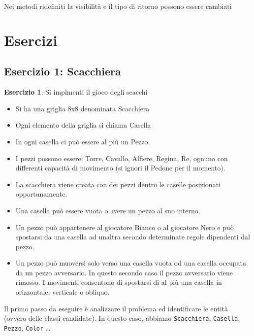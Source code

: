 \documentclass{article}
\begin{document}
Nei metodi ridefiniti la visibilità e il tipo di ritorno possono essere cambiati







\section{Esercizi}

\subsection{Esercizio 1: Scacchiera}
\begin{framed}
\textbf{Esercizio 1}: Si implmenti il gioco degli scacchi
\begin{itemize}
\item Si ha una griglia 8x8 denominata Scacchiera
\item Ogni elemento della griglia si chiama Casella
\item  In ogni casella ci pu\`o essere al pi\`u un Pezzo
\item  I pezzi possono essere: Torre, Cavallo, Alfiere, Regina, Re, ognuno con differenti capacit\`a di movimento (si ignori il Pedone per il momento).
\item La scacchiera viene creata con dei pezzi dentro le caselle posizionati opportunamente.
\item  Una casella pu\`o essere vuota o avere un pezzo al suo interno.
\item Un pezzo pu\`o appartenere al giocatore Bianco o al giocatore Nero e pu\`o spostarsi da una casella ad unaltra secondo determinate regole dipendenti dal pezzo.
\item Un pezzo pu\`o muoversi solo verso una casella vuota od una casella occupata da un pezzo avversario. In questo secondo caso il pezzo avversario viene rimosso. I movimenti consentono di spostarsi di al pi\`u una casella in orizzontale, verticale o obliquo.
\end{itemize}
\end{framed}

Il primo passo da eseguire \`e analizzare il problema ed identificare le entit\`a (ovvero delle classi candidate). In questo caso, abbiamo \texttt{Scacchiera}, \texttt{Casella}, \texttt{Pezzo},  \texttt{Color} \ldots
\end{document}
